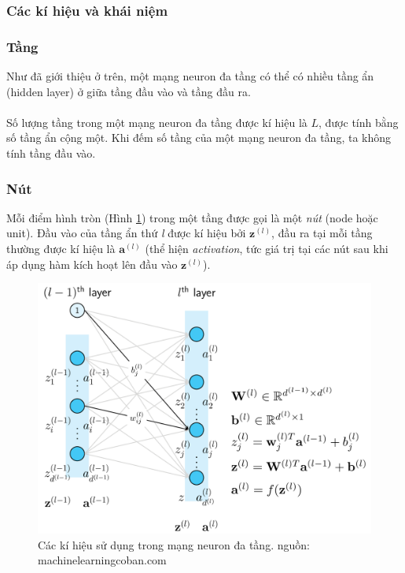 \documentclass{article}
\begin{document}
\subsubsection{Các kí hiệu và khái niệm}
\subsubsection*{Tầng}
Như đã giới thiệu ở trên, một mạng neuron đa tầng có thể có nhiều tầng ẩn (hidden layer) ở giữa tầng đầu vào và tầng đầu ra.\\\\
Số lượng tầng trong một mạng neuron đa tầng được kí hiệu là $L$, được tính bằng số tầng ẩn cộng một. Khi đếm số tầng của một mạng neuron đa tầng, ta không tính tầng đầu vào.
\subsubsection*{Nút}
Mỗi điểm hình tròn (Hình \ref{fig18}) trong một tầng được gọi là một \textit{nút} (node hoặc unit). Đầu vào của tầng ẩn thứ \textit{l} được kí hiệu bởi $\textbf{z}^{(l)}$, đầu ra tại mỗi tầng thường được kí hiệu là $\textbf{a}^{(l)}$ (thể hiện \textit{activation}, tức giá trị tại các nút sau khi áp dụng hàm kích hoạt lên đầu vào $\textbf{z}^{(l)}$). 
\begin{figure}[ht!]
\begin{minipage}[c]{0.57\linewidth}
\includegraphics[width = \linewidth]{mlp_notation.png}
\end{minipage} \hfill
\begin{minipage}[c]{0.4\linewidth}
    \caption{Các kí hiệu sử dụng trong mạng neuron đa tầng. nguồn: machinelearningcoban.com  
}
    \label{fig18}
\end{minipage}
\end{figure}
\end{document}
